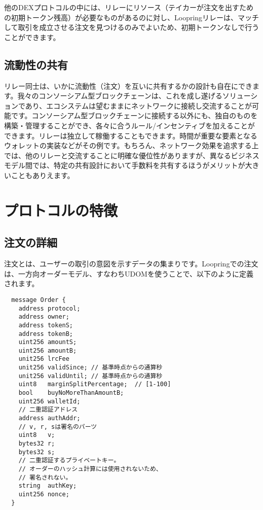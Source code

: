 \documentclass{article}
\begin{document}
\begin{multicols}{2}
他のDEXプロトコルの中には、リレーにリソース（テイカーが注文を出すための初期トークン残高）が必要なものがあるのに対し、Loopringリレーは、マッチして取引を成立させる注文を見つけるのみでよいため、初期トークンなしで行うことができます。

\subsection{流動性の共有\label{sec:liquidity_sharing}}
リレー同士は、いかに流動性（注文）を互いに共有するかの設計も自在にできます。我々のコンソーシアム型ブロックチェーンは、これを成し遂げるソリューションであり、エコシステムは望むままにネットワークに接続し交流することが可能です。コンソーシアム型ブロックチェーンに接続する以外にも、独自のものを構築・管理することができ、各々に合うルール/インセンティブを加えることができます。リレーは独立して稼働することもできます。時間が重要な要素となるウォレットの実装などがその例です。もちろん、ネットワーク効果を追求する上では、他のリレーと交流することに明確な優位性がありますが、異なるビジネスモデル間では、特定の共有設計において手数料を共有するほうがメリットが大きいこともありえます。


\section{プロトコルの特徴\label{sec:protocol}}

\subsection{注文の詳細\label{anatomy}}
注文とは、ユーザーの取引の意図を示すデータの集まりです。Loopringでの注文は、一方向オーダーモデル、すなわちUDOMを使うことで、以下のように定義されます。

\begin{verbatim}
  message Order {
    address protocol;
    address owner;
    address tokenS;
    address tokenB;
    uint256 amountS;
    uint256 amountB;
    unit256 lrcFee
    unit256 validSince; // 基準時点からの通算秒
    unit256 validUntil; // 基準時点からの通算秒
    uint8   marginSplitPercentage;  // [1-100]
    bool    buyNoMoreThanAmountB;
    uint256 walletId;
    // 二重認証アドレス
    address authAddr;
   	// v, r, sは署名のパーツ
    uint8   v;       
    bytes32 r;
    bytes32 s;
    // 二重認証するプライベートキー。
    // オーダーのハッシュ計算には使用されないため、
    // 署名されない。
    string  authKey;          
    uint256 nonce;
  }
\end{verbatim}



\end{multicols}
\end{document}
